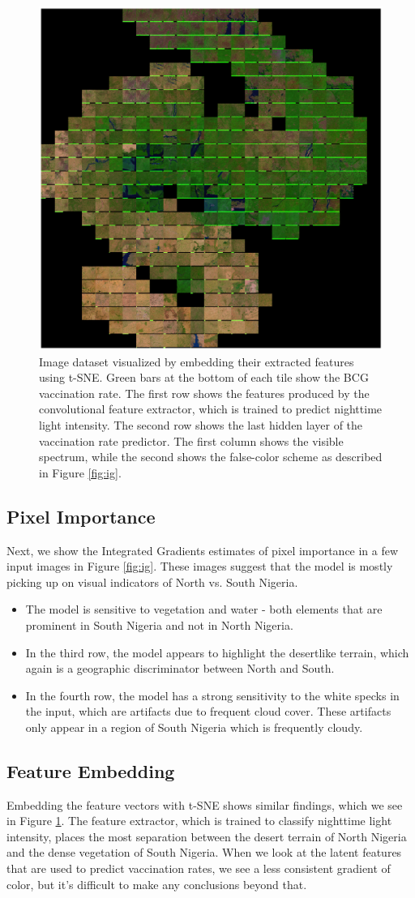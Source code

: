 \documentclass[]{article}
\begin{document}
\begin{figure}[p!]
\includegraphics[width=.45\linewidth]{tsne4.png}
\caption{Image dataset visualized by embedding their extracted features using t-SNE. Green bars at the bottom of each tile show the BCG vaccination rate. The first row shows the features produced by the convolutional feature extractor, which is trained to predict nighttime light intensity. The second row shows the last hidden layer of the vaccination rate predictor. The first column shows the visible spectrum, while the second shows the false-color scheme as described in Figure \ref{fig:ig}.}
\label{fig:tsne}
\end{figure}

\subsection{Pixel Importance}
Next, we show the Integrated Gradients estimates of pixel importance in a few input images in Figure \ref{fig:ig}. These images suggest that the model is mostly picking up on visual indicators of North vs. South Nigeria.
\begin{itemize}
\item The model is sensitive to vegetation and water - both elements that are prominent in South Nigeria and not in North Nigeria. 
\item In the third row, the model appears to highlight the desertlike terrain, which again is a geographic discriminator between North and South.
\item In the fourth row, the model has a strong sensitivity to the white specks in the input, which are artifacts due to frequent cloud cover. These artifacts only appear in a region of South Nigeria which is frequently cloudy.
\end{itemize}

\subsection{Feature Embedding}
Embedding the feature vectors with t-SNE shows similar findings, which we see in Figure \ref{fig:tsne}. The feature extractor, which is trained to classify nighttime light intensity, places the most separation between the desert terrain of North Nigeria and the dense vegetation of South Nigeria. When we look at the latent features that are used to predict vaccination rates, we see a less consistent gradient of color, but it's difficult to make any conclusions beyond that.
\end{document}
